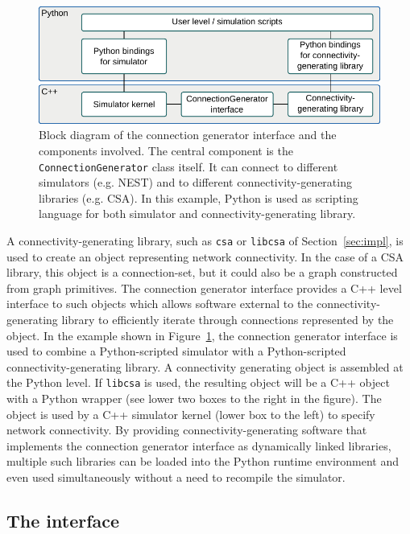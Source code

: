\documentclass{frontiersSCNS} %
\newcommand{\INLINEFIGS}{} %
\newcommand{\Figure}[2]{Figure~\ref{#2}}
\newcommand{\Figure}[2]{Figure~#1}
\begin{document}
\ifdefined\INLINEFIGS
\begin{figure}[ht]
\centering
\includegraphics[scale=.8]{figures/block_diagram_conngen.pdf}
\caption{Block diagram of the connection generator interface and the
  components involved. The central component is the
  \texttt{ConnectionGenerator} class itself. It can connect to different
  simulators (e.g. NEST) and to different connectivity-generating
  libraries (e.g. CSA). In this example, Python is used as scripting
  language for both simulator and connectivity-generating
  library.}\label{fig:block_diagram_conngen}
\end{figure}
\fi

A connectivity-generating library, such as \verb|csa| or \verb|libcsa|
of Section~\ref{sec:impl}, is used to create an object representing
network connectivity.  In the case of a CSA library, this object is a
connection-set, but it could also be a graph constructed from graph
primitives. The connection generator interface provides a C++ level
interface to such objects which allows software external to the
connectivity-generating library to efficiently iterate through
connections represented by the object.  In the example shown in
\Figure{2}{fig:block_diagram_conngen}, the connection generator
interface is used to combine a Python-scripted simulator with a
Python-scripted connectivity-generating library.  A connectivity
generating object is assembled at the Python level.  If \verb|libcsa|
is used, the resulting object will be a C++ object with a Python
wrapper (see lower two boxes to the right in the figure). The object
is used by a C++ simulator kernel (lower box to the left) to specify
network connectivity. By providing connectivity-generating software
that implements the connection generator interface as dynamically
linked libraries, multiple such libraries can be loaded into the
Python runtime environment and even used simultaneously without a need
to recompile the simulator.

\subsection{The interface}\label{sec:cgint}
\end{document}
